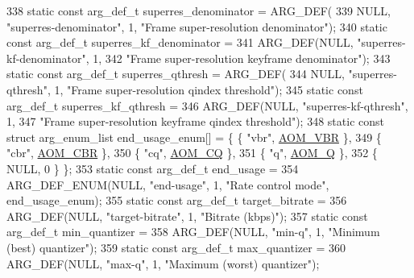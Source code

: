 \begin{DoxyCodeInclude}
{{{338 \textcolor{keyword}{static} \textcolor{keyword}{const} arg\_def\_t superres\_denominator = ARG\_DEF(
339     NULL, \textcolor{stringliteral}{"superres-denominator"}, 1, \textcolor{stringliteral}{"Frame super-resolution denominator"});
340 \textcolor{keyword}{static} \textcolor{keyword}{const} arg\_def\_t superres\_kf\_denominator =
341     ARG\_DEF(NULL, \textcolor{stringliteral}{"superres-kf-denominator"}, 1,
342         \textcolor{stringliteral}{"Frame super-resolution keyframe denominator"});
343 \textcolor{keyword}{static} \textcolor{keyword}{const} arg\_def\_t superres\_qthresh = ARG\_DEF(
344     NULL, \textcolor{stringliteral}{"superres-qthresh"}, 1, \textcolor{stringliteral}{"Frame super-resolution qindex threshold"});
345 \textcolor{keyword}{static} \textcolor{keyword}{const} arg\_def\_t superres\_kf\_qthresh =
346     ARG\_DEF(NULL, \textcolor{stringliteral}{"superres-kf-qthresh"}, 1,
347         \textcolor{stringliteral}{"Frame super-resolution keyframe qindex threshold"});
348 \textcolor{keyword}{static} \textcolor{keyword}{const} \textcolor{keyword}{struct }arg\_enum\_list end\_usage\_enum[] = \{ \{ \textcolor{stringliteral}{"vbr"}, \hyperlink{group__encoder_gga7c084d3ecef569aad166ce70b0e8a957a7d3a2574737ea63d0f160ffdbd7f0110}{AOM\_VBR} \},
349     \{ \textcolor{stringliteral}{"cbr"}, \hyperlink{group__encoder_gga7c084d3ecef569aad166ce70b0e8a957a14b6057d61c61e6117f5af16dcf89b0c}{AOM\_CBR} \},
350     \{ \textcolor{stringliteral}{"cq"}, \hyperlink{group__encoder_gga7c084d3ecef569aad166ce70b0e8a957a70aa1f15e91f6576ba3e63879947be64}{AOM\_CQ} \},
351     \{ \textcolor{stringliteral}{"q"}, \hyperlink{group__encoder_gga7c084d3ecef569aad166ce70b0e8a957aff3bbd4fe870b4b946c2093e59eb14e5}{AOM\_Q} \},
352     \{ NULL, 0 \} \};
353 \textcolor{keyword}{static} \textcolor{keyword}{const} arg\_def\_t end\_usage =
354     ARG\_DEF\_ENUM(NULL, \textcolor{stringliteral}{"end-usage"}, 1, \textcolor{stringliteral}{"Rate control mode"}, end\_usage\_enum);
355 \textcolor{keyword}{static} \textcolor{keyword}{const} arg\_def\_t target\_bitrate =
356     ARG\_DEF(NULL, \textcolor{stringliteral}{"target-bitrate"}, 1, \textcolor{stringliteral}{"Bitrate (kbps)"});
357 \textcolor{keyword}{static} \textcolor{keyword}{const} arg\_def\_t min\_quantizer =
358     ARG\_DEF(NULL, \textcolor{stringliteral}{"min-q"}, 1, \textcolor{stringliteral}{"Minimum (best) quantizer"});
359 \textcolor{keyword}{static} \textcolor{keyword}{const} arg\_def\_t max\_quantizer =
360     ARG\_DEF(NULL, \textcolor{stringliteral}{"max-q"}, 1, \textcolor{stringliteral}{"Maximum (worst) quantizer"});
}}}
\end{DoxyCodeInclude}
